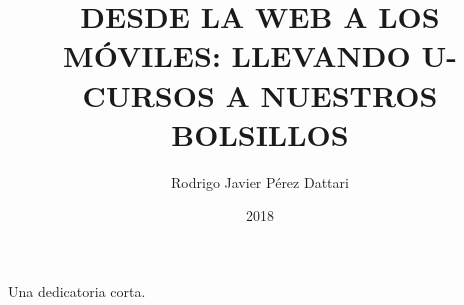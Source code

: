 \documentclass[upright, contnum]{umemoria}
\author{Rodrigo Javier Pérez Dattari}
\title{DESDE LA WEB A LOS MÓVILES: LLEVANDO U-CURSOS A NUESTROS BOLSILLOS}
\date{2018}
\begin{document}
\frontmatter
\maketitle

\begin{abstract}
\lipsum[1-4]
\end{abstract}

\begin{dedicatoria}
Una dedicatoria corta.
\end{dedicatoria}

\begin{thanks}
\lipsum[1-2]
\end{thanks}

\cleardoublepage
\tableofcontents
\cleardoublepage
\listoftables
\cleardoublepage
\listoffigures

\mainmatter






\nocite{*}


\end{document}

